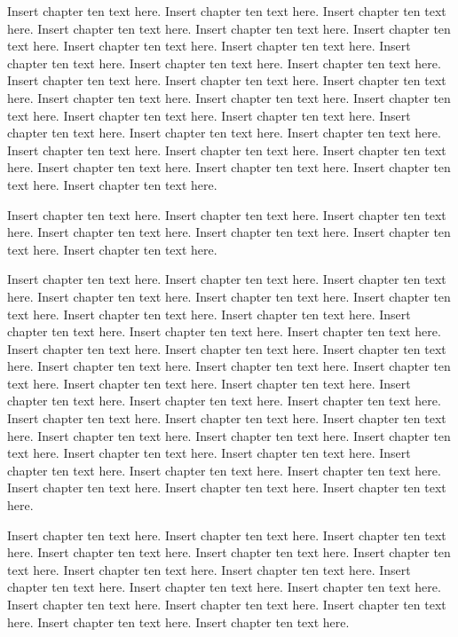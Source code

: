 Insert chapter ten text here. Insert chapter ten text here. Insert chapter ten text here. Insert chapter ten text here. Insert chapter ten text here. Insert chapter ten text here. Insert chapter ten text here. Insert chapter ten text here. Insert chapter ten text here. Insert chapter ten text here. Insert chapter ten text here. Insert chapter ten text here. Insert chapter ten text here. Insert chapter ten text here. Insert chapter ten text here. Insert chapter ten text here. Insert chapter ten text here. Insert chapter ten text here. Insert chapter ten text here. Insert chapter ten text here. Insert chapter ten text here. Insert chapter ten text here. Insert chapter ten text here. Insert chapter ten text here. Insert chapter ten text here. Insert chapter ten text here. Insert chapter ten text here. Insert chapter ten text here. Insert chapter ten text here. 

Insert chapter ten text here. Insert chapter ten text here. Insert chapter ten text here. Insert chapter ten text here. Insert chapter ten text here. Insert chapter ten text here. Insert chapter ten text here.

Insert chapter ten text here. Insert chapter ten text here. Insert chapter ten text here. Insert chapter ten text here. Insert chapter ten text here. Insert chapter ten text here. Insert chapter ten text here. Insert chapter ten text here. Insert chapter ten text here. Insert chapter ten text here. Insert chapter ten text here. Insert chapter ten text here. Insert chapter ten text here. Insert chapter ten text here. Insert chapter ten text here. Insert chapter ten text here. Insert chapter ten text here. Insert chapter ten text here. Insert chapter ten text here. Insert chapter ten text here. Insert chapter ten text here. Insert chapter ten text here. Insert chapter ten text here. Insert chapter ten text here. Insert chapter ten text here. Insert chapter ten text here. Insert chapter ten text here. Insert chapter ten text here. Insert chapter ten text here. Insert chapter ten text here. Insert chapter ten text here. Insert chapter ten text here. Insert chapter ten text here. Insert chapter ten text here. Insert chapter ten text here. Insert chapter ten text here.

Insert chapter ten text here. Insert chapter ten text here. Insert chapter ten text here. Insert chapter ten text here. Insert chapter ten text here. Insert chapter ten text here. Insert chapter ten text here. Insert chapter ten text here. Insert chapter ten text here. Insert chapter ten text here. Insert chapter ten text here. Insert chapter ten text here. Insert chapter ten text here. Insert chapter ten text here. Insert chapter ten text here. Insert chapter ten text here.

